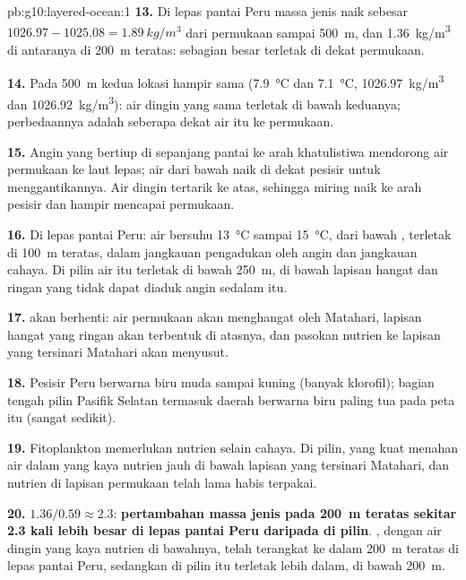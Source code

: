 \begin{solution}{pb:g10:layered-ocean:1}
\textbf{13.} Di lepas pantai Peru massa jenis naik sebesar $1026.97 - 1025.08 =
\qty{1.89}{kg/m^3}$ dari permukaan sampai \qty{500}{m}, dan
\qty{1.36}{kg/m^3} di antaranya di \qty{200}{m} teratas: sebagian besar
terletak di dekat permukaan.

\textbf{14.} Pada \qty{500}{m} kedua lokasi hampir sama
(\qty{7.9}{\degreeCelsius} dan \qty{7.1}{\degreeCelsius},
\qty{1026.97}{kg/m^3} dan \qty{1026.92}{kg/m^3}): air dingin yang sama
terletak di bawah keduanya; perbedaannya adalah seberapa dekat air itu ke
permukaan.

\textbf{15.} Angin yang bertiup di sepanjang pantai ke arah khatulistiwa
mendorong air permukaan ke laut lepas; air dari bawah naik di dekat pesisir
untuk menggantikannya. Air dingin  tertarik ke atas, sehingga
 miring naik ke arah pesisir dan hampir mencapai permukaan.

\textbf{16.} Di lepas pantai Peru: air bersuhu \qty{13}{\degreeCelsius}
sampai \qty{15}{\degreeCelsius}, dari bawah , terletak di
\qty{100}{m} teratas, dalam jangkauan pengadukan oleh angin dan jangkauan
cahaya. Di pilin air itu terletak di bawah \qty{250}{m}, di bawah lapisan
hangat dan ringan yang tidak dapat diaduk angin sedalam itu.

\textbf{17.}  akan berhenti: air permukaan akan menghangat
oleh Matahari, lapisan hangat yang ringan akan terbentuk di atasnya, dan
pasokan nutrien ke lapisan yang tersinari Matahari akan menyusut.

\textbf{18.} Pesisir Peru berwarna biru muda sampai kuning (banyak klorofil);
bagian tengah pilin Pasifik Selatan termasuk daerah berwarna biru paling tua
pada peta itu (sangat sedikit).

\textbf{19.} Fitoplankton memerlukan nutrien selain cahaya. Di pilin,
 yang kuat menahan air dalam yang kaya nutrien jauh di bawah
lapisan yang tersinari Matahari, dan nutrien di lapisan permukaan telah lama
habis terpakai.

\textbf{20.} $1.36/0.59 \approx 2.3$: \textbf{pertambahan massa jenis pada
\qty{200}{m} teratas sekitar 2.3 kali lebih besar di lepas pantai Peru
daripada di pilin}. , dengan air dingin yang kaya nutrien di
bawahnya, telah terangkat ke dalam \qty{200}{m} teratas di lepas pantai Peru,
sedangkan di pilin  itu terletak lebih dalam, di bawah \qty{200}{m}.
\end{solution}
